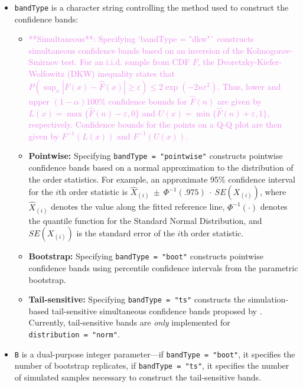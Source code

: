 \begin{itemize}
\item
  \texttt{bandType} is a character string controlling the method used to
  construct the confidence bands:

  \begin{itemize}
  \item
    {\textcolor{violet}{**Simultaneous**: Specifying `bandType = "dkw"` constructs simultaneous confidence bands based on an inversion of the Kolmogorov-Smirnov test. For an i.i.d. sample from CDF $F$, the Dvoretzky-Kiefer-Wolfowitz (DKW) inequality \citep{dkw, massart-dkw} states that $P(\sup_{x} | F(x) - \widehat{F}(x)| \ge \varepsilon) \le 2 \exp(-2n\varepsilon^2)$. Thus, lower and upper $(1-\alpha)100\%$ confidence bounds for $\widehat{F}(n)$ are given by $L(x) = \max\{ \widehat{F}(n) - \varepsilon, 0 \}$ and $U(x) = \min\{ \widehat{F}(n) + \varepsilon, 1 \}$, respectively. Confidence bounds for the points on a Q-Q plot are then given by $F^{-1} (L(x))$ and $F^{-1} (U(x))$.}}
  \item
    \textbf{Pointwise:} Specifying \texttt{bandType\ =\ "pointwise"}
    constructs pointwise confidence bands based on a normal
    approximation to the distribution of the order statistics. For
    example, an approximate 95\% confidence interval for the \(i\)th
    order statistic is
    \(\widehat{X}_{(i)}~\pm~\Phi^{-1}(.975)~\cdot~SE(X_{(i)})\), where
    \(\widehat{X}_{(i)}\) denotes the value along the fitted reference
    line, \(\Phi^{-1}(\cdot)\) denotes the quantile function for the
    Standard Normal Distribution, and \(SE(X_{(i)})\) is the standard
    error of the \(i\)th order statistic.
  \item
    \textbf{Bootstrap:} Specifying \texttt{bandType\ =\ "boot"}
    constructs pointwise confidence bands using percentile confidence
    intervals from the parametric bootstrap.
  \item
    \textbf{Tail-sensitive:} Specifying \texttt{bandType\ =\ "ts"}
    constructs the simulation-based tail-sensitive simultaneous
    confidence bands proposed by \citet{Aldor-Noiman2013-xw}. Currently,
    tail-sensitive bands are \emph{only} implemented for
    \texttt{distribution\ =\ "norm"}.
  \end{itemize}
\item
  \texttt{B} is a dual-purpose integer parameter---if
  \texttt{bandType\ =\ "boot"}, it specifies the number of bootstrap
  replicates, if \texttt{bandType\ =\ "ts"}, it specifies the number of
  simulated samples necessary to construct the tail-sensitive bands.

\end{itemize}
